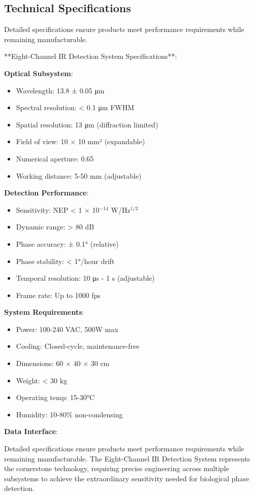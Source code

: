 \documentclass[12pt,a4paper]{report}
\begin{document}
\subsection{Technical Specifications}

Detailed specifications ensure products meet performance requirements while remaining manufacturable.

**Eight-Channel IR Detection System Specifications**:

\textbf{Optical Subsystem}:
\begin{itemize}
\item Wavelength: 13.8 ± 0.05 μm
\item Spectral resolution: < 0.1 μm FWHM
\item Spatial resolution: 13 μm (diffraction limited)
\item Field of view: 10 × 10 mm² (expandable)
\item Numerical aperture: 0.65
\item Working distance: 5-50 mm (adjustable)
\end{itemize}

\textbf{Detection Performance}:
\begin{itemize}
\item Sensitivity: NEP < 1 × 10$^{-14}$ W/Hz$^{1/2}$
\item Dynamic range: > 80 dB
\item Phase accuracy: ± 0.1° (relative)
\item Phase stability: < 1°/hour drift
\item Temporal resolution: 10 μs - 1 s (adjustable)
\item Frame rate: Up to 1000 fps
\end{itemize}

\textbf{System Requirements}:
\begin{itemize}
\item Power: 100-240 VAC, 500W max
\item Cooling: Closed-cycle, maintenance-free
\item Dimensions: 60 × 40 × 30 cm
\item Weight: < 30 kg
\item Operating temp: 15-30°C
\item Humidity: 10-80\% non-condensing
\end{itemize}

\textbf{Data Interface}:

Detailed specifications ensure products meet performance requirements while remaining manufacturable. The Eight-Channel IR Detection System represents the cornerstone technology, requiring precise engineering across multiple subsystems to achieve the extraordinary sensitivity needed for biological phase detection.
\end{document}

